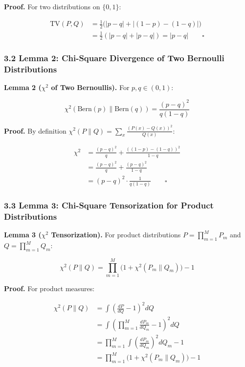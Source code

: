 \documentclass[
  12pt,
]{article}
\begin{document}
\textbf{Proof.} For two distributions on \(\{0,1\}\):

\[\begin{aligned}
\text{TV}(P, Q) &= \frac{1}{2} \bigl(|p - q| + |(1-p) - (1-q)|\bigr) \\
&= \frac{1}{2}(|p-q| + |p-q|) = |p-q| \qquad \square
\end{aligned}\]

\subsubsection{3.2 Lemma 2: Chi-Square Divergence of Two Bernoulli
Distributions}\label{lemma-2-chi-square-divergence-of-two-bernoulli-distributions}

\textbf{Lemma 2 (\(\chi^2\) of Two Bernoullis).} For \(p, q \in (0,1)\):

\[\chi^2(\text{Bern}(p) \parallel \text{Bern}(q)) = \frac{(p-q)^2}{q(1-q)}\]

\textbf{Proof.} By definition
\(\chi^2(P \parallel Q) = \sum_x \frac{(P(x)-Q(x))^2}{Q(x)}\):

\[\begin{aligned}
\chi^2 &= \frac{(p-q)^2}{q} + \frac{((1-p)-(1-q))^2}{1-q} \\
&= \frac{(p-q)^2}{q} + \frac{(p-q)^2}{1-q} \\
&= (p-q)^2 \cdot \frac{1}{q(1-q)} \qquad \square
\end{aligned}\]

\subsubsection{3.3 Lemma 3: Chi-Square Tensorization for Product
Distributions}\label{lemma-3-chi-square-tensorization-for-product-distributions}

\textbf{Lemma 3 (\(\chi^2\) Tensorization).} For product distributions
\(P = \prod_{m=1}^M P_m\) and \(Q = \prod_{m=1}^M Q_m\):

\[\chi^2(P \parallel Q) = \prod_{m=1}^M \bigl(1 + \chi^2(P_m \parallel Q_m)\bigr) - 1\]

\textbf{Proof.} For product measures:

\[\begin{aligned}
\chi^2(P \parallel Q) &= \int \left(\frac{dP}{dQ} - 1\right)^2 dQ \\
&= \int \left(\prod_{m=1}^M \frac{dP_m}{dQ_m} - 1\right)^2 dQ \\
&= \prod_{m=1}^M \int \left(\frac{dP_m}{dQ_m}\right)^2 dQ_m - 1 \\
&= \prod_{m=1}^M \bigl(1 + \chi^2(P_m \parallel Q_m)\bigr) - 1
\end{aligned}\]
\end{document}
